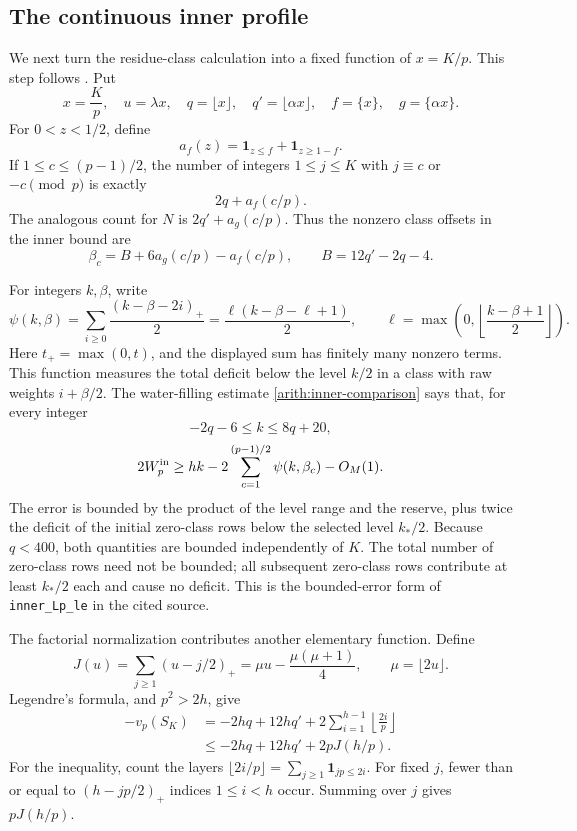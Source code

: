 \subsection{The continuous inner profile}

We next turn the residue-class calculation into a fixed function of
\(x=K/p\). This step follows
\cite[\texttt{Growth/ClassSum.lean}, \texttt{ClassData.lean},
\texttt{InnerPrime.lean}, \texttt{TablePrime.lean}]{firsching}.
Put
\[
 x=\frac Kp,\quad u=\lambda x,\quad
 q=\lfloor x\rfloor,\quad q'=\lfloor\alpha x\rfloor,\quad
 f=\{x\},\quad g=\{\alpha x\}.
\]
For \(0<z<1/2\), define
\begin{equation}\label{growth:af}
 a_f(z)=\mathbf1_{z\le f}+\mathbf1_{z\ge1-f}.
\end{equation}
If \(1\le c\le(p-1)/2\), the number of integers \(1\le j\le K\)
with \(j\equiv c\) or \(-c\pmod p\) is exactly
\[
 2q+a_f(c/p).
\]
The analogous count for \(N\) is \(2q'+a_g(c/p)\). Thus the nonzero
class offsets in the inner bound are
\[
 \beta_c=B+6a_g(c/p)-a_f(c/p),\qquad B=12q'-2q-4.
\]

For integers \(k,\beta\), write
\begin{equation}\label{growth:psi}
 \psi(k,\beta)=
 \sum_{i\ge0}\frac{(k-\beta-2i)_+}{2}
 =\frac{\ell(k-\beta-\ell+1)}2,\qquad
 \ell=\max\!\left(0,\left\lfloor\frac{k-\beta+1}{2}\right\rfloor\right).
\end{equation}
Here \(t_+=\max(0,t)\), and the displayed sum has finitely many
nonzero terms. This function measures the total deficit below the
level \(k/2\) in a class with raw weights \(i+\beta/2\).
The water-filling estimate \eqref{arith:inner-comparison} says that,
for every integer
\[
 -2q-6\le k\le8q+20,
\]
\begin{equation}\label{growth:WI}
 2W_p^{\rm in}\ge
 hk-2\sum_{c=1}^{(p-1)/2}\psi(k,\beta_c)-O_M(1).
\end{equation}
The error is bounded by the product of the level range and the reserve,
plus twice the deficit of the initial zero-class rows below the selected
level \(k_*/2\).
Because \(q<400\), both quantities are bounded independently of \(K\).
The total number of zero-class rows need not be bounded; all subsequent
zero-class rows contribute at least \(k_*/2\) each and cause no deficit.
This is the bounded-error form of \texttt{inner\_Lp\_le} in the cited
source.

The factorial normalization contributes another elementary function.
Define
\begin{equation}\label{growth:J}
 J(u)=\sum_{j\ge1}(u-j/2)_+
 =\mu u-\frac{\mu(\mu+1)}4,\qquad \mu=\lfloor2u\rfloor.
\end{equation}
Legendre's formula, and \(p^2>2h\), give
\begin{align*}
 -v_p(S_K)
 &=-2hq+12hq'+2\sum_{i=1}^{h-1}\left\lfloor\frac{2i}{p}\right\rfloor\\
 &\le -2hq+12hq'+2pJ(h/p).
\end{align*}
For the inequality, count the layers
\(\lfloor2i/p\rfloor=\sum_{j\ge1}\mathbf1_{jp\le2i}\).
For fixed \(j\), fewer than or equal to \((h-jp/2)_+\) indices
\(1\le i<h\) occur. Summing over \(j\) gives \(pJ(h/p)\).

